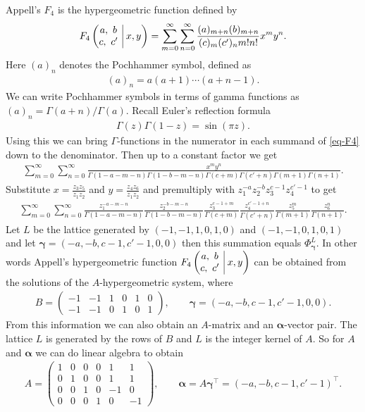 \documentclass[pdftex]{sigma}
\makeatletter
\newcommand*{\HG}[4]{#1\left(\begin{array}{@{}c|}
#2 \\ #3
\end{array}\,\,
#4
\right)}
\numberwithin{equation}{section}
\makeatother
\begin{document}
\begin{Example}
Appell's $F_4$ is the hypergeometric function defined by
\begin{gather}
\HG{F_4}{a,\,\,b}{c,\,\,c'}{x,y} = \sum_{m=0}^{\infty}\sum_{n=0}^{\infty} \frac{(a)_{m+n}(b)_{m+n}}{(c)_m(c')_{n}m!n!}x^my^n.\label{eq-F4}
\end{gather}
Here $(a)_n$ denotes the Pochhammer symbol, defined as
\begin{gather*}
(a)_n = a(a+1)\cdots(a+n-1).
\end{gather*}
We can write Pochhammer symbols in terms of gamma functions as $(a)_n = \Gamma(a+n)/\Gamma(a)$. Recall Euler's reflection formula
\begin{gather*}
\Gamma(z)\Gamma(1-z) = \sin(\pi z).
\end{gather*}
Using this we can bring $\Gamma$-functions in the numerator in each summand of \eqref{eq-F4} down to the denominator. Then up to a constant factor we get
\begin{gather*}
\sum_{m=0}^{\infty}\sum_{n=0}^{\infty} \frac{x^my^n}{\Gamma(1-a-m-n)\Gamma(1-b-m-n)\Gamma(c+m)\Gamma(c'+n)\Gamma(m+1)\Gamma(n+1)}.
\end{gather*}
Substitute $x = \frac{z_3z_5}{z_1z_2}$ and $y = \frac{z_4z_6}{z_1z_2}$ and premultiply with $z_1^{-a}z_2^{-b}z_3^{c-1}z_4^{c'-1}$ to get
\begin{gather*}
\sum_{m=0}^{\infty}\sum_{n=0}^{\infty}\frac{z_1^{-a-m-n}} {\Gamma(1\!-a\!-m\!-n)} \frac{z_2^{-b-m-n}}{\Gamma(1\!-b\!-m\!-n)} \frac{z_3^{c-1+m}} {\Gamma(c+m)}\frac{z_4^{c'-1+n}}{\Gamma(c'+n)} \frac{z_5^m}{\Gamma(m+1)}  \frac{z_6^{n}}{\Gamma(n+1)}.
\end{gather*}
Let $L$ be the lattice generated by $(-1,-1,1,0,1,0)$ and $(-1,-1,0,1,0,1)$ and let $\bm{\gamma} = (-a,-b,\allowbreak c-1,c'-1,0,0)$ then this summation equals $\Phi_{\bm\gamma}^L$. In other words Appell's hypergeometric function
$\HG{F_4}{a,\,\,b}{c,\,\,c'}{x,y}$ can be obtained from the solutions of the $A$-hypergeometric system, where
\begin{gather*}
B = \begin{pmatrix}-1&-1&1&0&1&0\\-1&-1&0&1&0&1\end{pmatrix}\!,\qquad
\bm\gamma = (-a,-b,c-1,c'-1,0,0).
\end{gather*}
From this information we can also obtain an $A$-matrix and an $\bm{\alpha}$-vector pair. The lattice $L$ is generated by the rows of $B$ and $L$ is the integer kernel of $A$. So for $A$ and $\bm{\alpha}$ we can do linear algebra to obtain
\begin{gather*}
A = \begin{pmatrix}1 & 0 & 0 & 0 & 1 & 1 \\
0 & 1 & 0 & 0 & 1 & 1 \\
0 & 0 & 1 & 0 & -1 & 0 \\
0 & 0 & 0 & 1 & 0 & -1 \end{pmatrix}\!,\qquad
\bm{\alpha} = A\bm{\gamma}^{\intercal} = (-a, -b, c - 1, c' - 1)^{\intercal}.
\end{gather*}
\end{Example}
\end{document}
